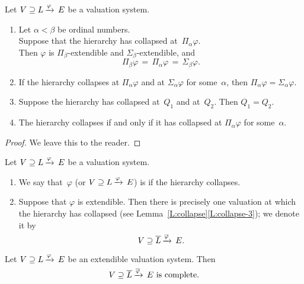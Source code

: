 \begin{lem}
\label{L:collapse}
Let $V \supseteq L\,\smash{\xrightarrow{\varphi}\,E}$
be a valuation system.
\begin{enumerate}
\item
\label{L:collapse-1}
Let $\alpha<\beta$ be ordinal numbers.\\
Suppose that the hierarchy has collapsed at~$\Pi_\alpha \varphi$.\\
Then $\varphi$ is $\Pi_\beta$-extendible and $\Sigma_\beta$-extendible,
and  
\begin{equation*}
\Pi_\beta \varphi \,=\, \Pi_\alpha \varphi \,=\, \Sigma_\beta \varphi.
\end{equation*}
\item
\label{L:collapse-2}
If the hierarchy collapses
at $\Pi_\alpha \varphi$ and at $\Sigma_\alpha\varphi$
for some~$\alpha$,
then $\Pi_\alpha\varphi = \Sigma_\alpha\varphi$.

\item
\label{L:collapse-3}
Suppose the hierarchy has collapsed at~$Q_1$ and at~$Q_2$.
Then $Q_1 = Q_2$.
\item
\label{L:collapse-4}
The hierarchy collapses
if and only if 
it has collapsed at $\Pi_\alpha \varphi$
for some~$\alpha$.
\end{enumerate}
\end{lem}
\begin{proof}
We leave this to the reader.
\end{proof}
%
%
\begin{dfn}
\label{D:extendible}
Let $V \supseteq L\,\smash{\xrightarrow{\varphi}\,E}$ be a valuation system.
\begin{enumerate}
\item
\label{D:extendible-1}
We say that~$\varphi$ (or  $V \supseteq L\,\smash{\xrightarrow{\varphi}\,E}$) is 
if the hierarchy collapses.

\item
\label{D:extendible-2}
Suppose that $\varphi$ is extendible.
Then there is precisely one valuation
at which the hierarchy has collapsed
(see Lemma~\ref{L:collapse}\ref{L:collapse-3});
we denote it by
\begin{equation*}
V \supseteq \overline L\,\smash{\xrightarrow{\overline\varphi}\,E}.
\end{equation*}
\end{enumerate}
\end{dfn}
%
%
\begin{lem}
\label{L:complete}
Let $V \supseteq L\,\smash{\xrightarrow{\varphi}\,E}$ be an extendible valuation system.
Then
\begin{equation*}
V \supseteq \overline L\,\smash{\xrightarrow{\overline\varphi}\,E}
\text{ is complete.}
\end{equation*}
\end{lem}
